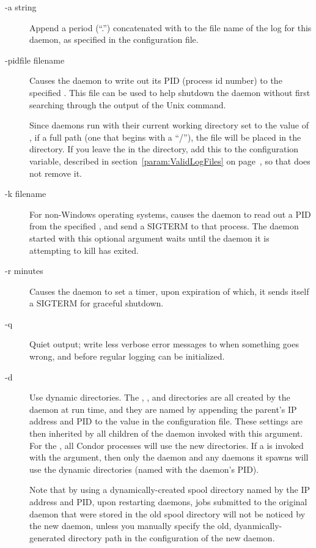 \begin{description}
\item[-a string] Append a period (``.'') concatenated with 
  to the file name of the log for this daemon,
  as specified in the configuration file.

\item[-pidfile filename] Causes the daemon to write out its PID
  (process id number) to the specified .
  This file can be used to
  help shutdown the daemon without first searching through 
  the output of the Unix  command.

  Since daemons run with their current working directory set to the
  value of , if a full path (one that begins with a ``/''),
  the file will be placed in the  directory.  If you leave
  the  in the  directory, add this
   to the  configuration variable,
  described in section~\ref{param:ValidLogFiles} on
  page~\pageref{param:ValidLogFiles}, so that  does not
  remove it.

\item[-k filename] For non-Windows operating systems,
  causes the daemon to read out a PID from the
  specified , and send a SIGTERM to that process.
  The daemon started with this optional argument waits until the
  daemon it is attempting to kill has exited.  

\item[-r minutes] Causes the daemon to set a timer, upon expiration
  of which, it sends itself a SIGTERM for graceful shutdown.

\item[-q] Quiet output; write less verbose error
 messages to  when something goes wrong,
 and before regular logging can be initialized.

\item[-d] Use dynamic directories.
 The , , and  directories
 are all created by the daemon at run time,
 and they are named by appending the
 parent's IP address and PID to the value in the 
 configuration file.
 These settings are then inherited by all children of the daemon
 invoked with this  argument.
 For the ,
 all Condor processes will use the new directories.
 If a  is invoked with the  argument,
 then only the  daemon and any
  daemons it spawns will use the dynamic
 directories (named with the  daemon's PID).

 Note that by using a dynamically-created spool directory
 named by the IP address and PID,
 upon restarting daemons,
 jobs submitted to the original  daemon
 that were stored in the old spool directory will not be noticed
 by the new  daemon,
 unless you manually specify the old, dyanmically-generated 
  directory path in the configuration of the
 new  daemon.

\end{description}

